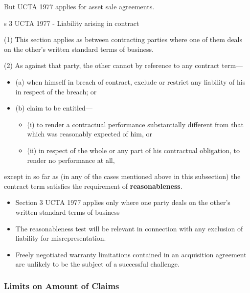 \documentclass[
]{article}
\providecommand{\tightlist}{%
  \setlength{\itemsep}{0pt}\setlength{\parskip}{0pt}}
\newenvironment{env-69c6d983-4e25-44a5-9a13-662902d85e33}
{
    \savenotes\tcolorbox[blanker,breakable,left=5pt,borderline west={2pt}{-4pt}{green}]
}
{
    \endtcolorbox\spewnotes
}
\begin{document}
But UCTA 1977 applies for asset sale agreements.

\begin{env-69c6d983-4e25-44a5-9a13-662902d85e33}

s 3 UCTA 1977 - Liability arising in contract

(1) This section applies as between contracting parties where one of
them deals on the other's written standard terms of business.

(2) As against that party, the other cannot by reference to any contract
term---

\begin{itemize}
\tightlist
\item
  (a) when himself in breach of contract, exclude or restrict any
  liability of his in respect of the breach; or
\item
  (b) claim to be entitled---

  \begin{itemize}
  \tightlist
  \item
    (i) to render a contractual performance substantially different from
    that which was reasonably expected of him, or
  \item
    (ii) in respect of the whole or any part of his contractual
    obligation, to render no performance at all,
  \end{itemize}
\end{itemize}

except in so far as (in any of the cases mentioned above in this
subsection) the contract term satisfies the requirement of
\textbf{reasonableness}.

\end{env-69c6d983-4e25-44a5-9a13-662902d85e33}

\begin{itemize}
\tightlist
\item
  Section 3 UCTA 1977 applies only where one party deals on the other's
  written standard terms of business
\item
  The reasonableness test will be relevant in connection with any
  exclusion of liability for misrepresentation.
\item
  Freely negotiated warranty limitations contained in an acquisition
  agreement are unlikely to be the subject of a successful challenge.
\end{itemize}

\hypertarget{limits-on-amount-of-claims}{%
\subsubsection{Limits on Amount of
Claims}\label{limits-on-amount-of-claims}}
\end{document}
